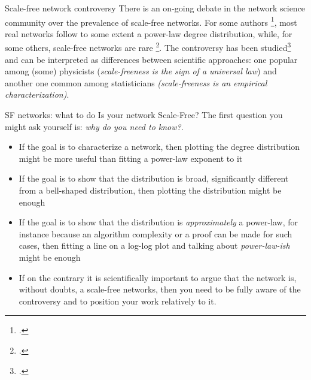 \begin{textbox}{Scale-free network controversy}
    There is an on-going debate in the network science community over the prevalence of scale-free networks. For some authors \footcite{barabasi2003scale}, most real networks follow to some extent a power-law degree distribution, while, for some others, scale-free networks are rare \footcite{broido2019scale}. The controversy has been studied\footcite{jacomy2020epistemic} and can be interpreted as differences between scientific approaches: one popular among (some) physicists (\textit{scale-freeness is the sign of a universal law}) and another one common among statisticians \textit{(scale-freeness is an empirical characterization)}.
\end{textbox}


\begin{textbox}{SF networks: what to do}
    Is your network Scale-Free? The first question you might ask yourself is: \textit{why do you need to know?}.
    \begin{itemize}
        \item If the goal is to characterize a network, then plotting the degree distribution might be more useful than fitting a power-law exponent to it
        \item If the goal is to show that the distribution is broad, significantly different from a bell-shaped distribution, then plotting the distribution might be enough
        \item If the goal is to show that the distribution is \textit{approximately} a power-law, for instance because an algorithm complexity or a proof can be made for such cases, then fitting a line on a log-log plot and talking about \textit{power-law-ish} might be enough
        \item If on the contrary it is scientifically important to argue that the network is, without doubts, a scale-free networks, then you need to be fully aware of the controversy and to position your work relatively to it.
    \end{itemize}
\end{textbox}